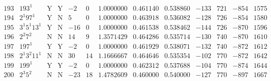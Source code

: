 \documentclass[11pt,reqno,a4letter]{article}
\numberwithin{equation}{section}
\numberwithin{figure}{section}
\numberwithin{table}{section}
\theoremstyle{plain}
\numberwithin{theorem}{section}
\theoremstyle{definition}
\begin{document}
\begin{table}[ht]
\begin{equation*}
{\begin{array}{cc|cc|ccc|cc|cccc}
 193 & 193^1 & \text{Y} & \text{Y} & -2 & 0 & 1.0000000 & 0.461140 & 0.538860 & -133 & 721 & -854 & 1575 \\
 194 & 2^1 97^1 & \text{Y} & \text{N} & 5 & 0 & 1.0000000 & 0.463918 & 0.536082 & -128 & 726 & -854 & 1580 \\
 195 & 3^1 5^1 13^1 & \text{Y} & \text{N} & -16 & 0 & 1.0000000 & 0.461538 & 0.538462 & -144 & 726 & -870 & 1596 \\
 196 & 2^2 7^2 & \text{N} & \text{N} & 14 & 9 & 1.3571429 & 0.464286 & 0.535714 & -130 & 740 & -870 & 1610 \\
 197 & 197^1 & \text{Y} & \text{Y} & -2 & 0 & 1.0000000 & 0.461929 & 0.538071 & -132 & 740 & -872 & 1612 \\
 198 & 2^1 3^2 11^1 & \text{N} & \text{N} & 30 & 14 & 1.1666667 & 0.464646 & 0.535354 & -102 & 770 & -872 & 1642 \\
 199 & 199^1 & \text{Y} & \text{Y} & -2 & 0 & 1.0000000 & 0.462312 & 0.537688 & -104 & 770 & -874 & 1644 \\
 200 & 2^3 5^2 & \text{N} & \text{N} & -23 & 18 & 1.4782609 & 0.460000 & 0.540000 & -127 & 770 & -897 & 1667 \\
\end{array}
}
\end{equation*}
\clearpage 

\end{table} 
\end{document}

